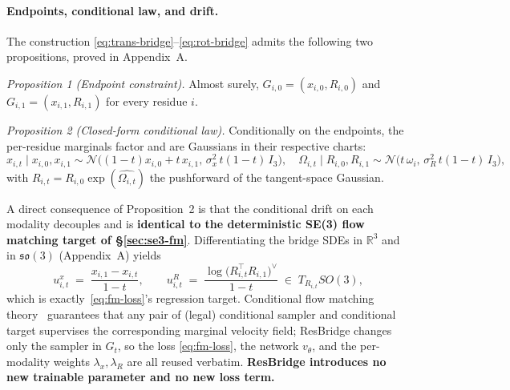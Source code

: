\documentclass{article}
\begin{document}
\paragraph{Endpoints, conditional law, and drift.}
The construction \eqref{eq:trans-bridge}--\eqref{eq:rot-bridge} admits the following two propositions, proved in Appendix~A.

\textit{Proposition 1 (Endpoint constraint).} Almost surely, $G_{i,0}=(x_{i,0},R_{i,0})$ and $G_{i,1}=(x_{i,1},R_{i,1})$ for every residue $i$.

\textit{Proposition 2 (Closed-form conditional law).} Conditionally on the endpoints, the per-residue marginals factor and are Gaussians in their respective charts:
\begin{equation*}
x_{i,t}\!\mid\!x_{i,0},x_{i,1}\sim\mathcal{N}\!\bigl((1-t)x_{i,0}+t\,x_{i,1},\,\sigma_x^{2}\,t(1-t)\,I_3\bigr),
\quad
\Omega_{i,t}\!\mid\!R_{i,0},R_{i,1}\sim\mathcal{N}\!\bigl(t\,\omega_i,\,\sigma_R^{2}\,t(1-t)\,I_3\bigr),
\end{equation*}
with $R_{i,t}=R_{i,0}\exp(\widehat{\Omega_{i,t}})$ the pushforward of the tangent-space Gaussian.

A direct consequence of Proposition~2 is that the conditional drift on each modality decouples and is \textbf{identical to the deterministic SE(3) flow matching target of \S\ref{sec:se3-fm}}. Differentiating the bridge SDEs in $\mathbb{R}^3$ and in $\mathfrak{so}(3)$ (Appendix~A) yields
\begin{equation}
u^{x}_{i,t}\;=\;\frac{x_{i,1}-x_{i,t}}{1-t},
\qquad
u^{R}_{i,t}\;=\;\frac{\log\!\bigl(R_{i,t}^{\!\top}R_{i,1}\bigr)^{\!\vee}}{1-t}\;\in\;T_{R_{i,t}}SO(3),
\label{eq:bridge-target}
\end{equation}
which is exactly~\eqref{eq:fm-loss}'s regression target. Conditional flow matching theory~\cite{lipman2022flow,tong2024improving} guarantees that any pair of (legal) conditional sampler and conditional target supervises the corresponding marginal velocity field; ResBridge changes only the sampler in $G_t$, so the loss \eqref{eq:fm-loss}, the network $v_\theta$, and the per-modality weights $\lambda_x,\lambda_R$ are all reused verbatim. \textbf{ResBridge introduces no new trainable parameter and no new loss term.}
\end{document}
